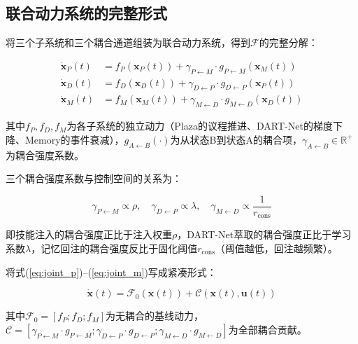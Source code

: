 \documentclass[twocolumn,10.5pt]{ctexart}
\def\R{\mathbb{R}}
\def\cC{\mathcal{C}}
\def\cF{\mathcal{F}}
\begin{document}
\subsection{联合动力系统的完整形式}

将三个子系统和三个耦合通道组装为联合动力系统，得到$\mathcal{F}$的完整分解：

\begin{align}
\dot{\mathbf{x}}_P(t) &= f_P(\mathbf{x}_P(t)) + \gamma_{P\leftarrow M} \cdot g_{P\leftarrow M}(\mathbf{x}_M(t)) \label{eq:joint_p} \\
\dot{\mathbf{x}}_D(t) &= f_D(\mathbf{x}_D(t)) + \gamma_{D\leftarrow P} \cdot g_{D\leftarrow P}(\mathbf{x}_P(t)) \label{eq:joint_d} \\
\dot{\mathbf{x}}_M(t) &= f_M(\mathbf{x}_M(t)) + \gamma_{M\leftarrow D} \cdot g_{M\leftarrow D}(\mathbf{x}_D(t)) \label{eq:joint_m}
\end{align}

其中$f_P, f_D, f_M$为各子系统的独立动力（Plaza的议程推进、DART-Net的梯度下降、Memory的事件衰减），$g_{A \leftarrow B}(\cdot)$为从状态B到状态A的耦合项，$\gamma_{A\leftarrow B} \in \R^+$为耦合强度系数。

三个耦合强度系数与控制空间的关系为：

\begin{equation}
\gamma_{P\leftarrow M} \propto \rho, \quad \gamma_{D\leftarrow P} \propto \lambda, \quad \gamma_{M\leftarrow D} \propto \frac{1}{r_{\text{cons}}}
\label{eq:gamma_relation}
\end{equation}

即技能注入的耦合强度正比于注入权重$\rho$，DART-Net萃取的耦合强度正比于学习系数$\lambda$，记忆回注的耦合强度反比于固化阈值$r_{\text{cons}}$（阈值越低，回注越频繁）。

将式(\ref{eq:joint_p})--(\ref{eq:joint_m})写成紧凑形式：

\begin{equation}
\dot{\mathbf{x}}(t) = \cF_0(\mathbf{x}(t)) + \cC(\mathbf{x}(t), \mathbf{u}(t))
\label{eq:full_joint}
\end{equation}

其中$\cF_0 = [f_P; f_D; f_M]$为无耦合的基线动力，$\cC = [\gamma_{P\leftarrow M} \cdot g_{P\leftarrow M}; \gamma_{D\leftarrow P} \cdot g_{D\leftarrow P}; \gamma_{M\leftarrow D} \cdot g_{M\leftarrow D}]$为全部耦合贡献。
\end{document}
